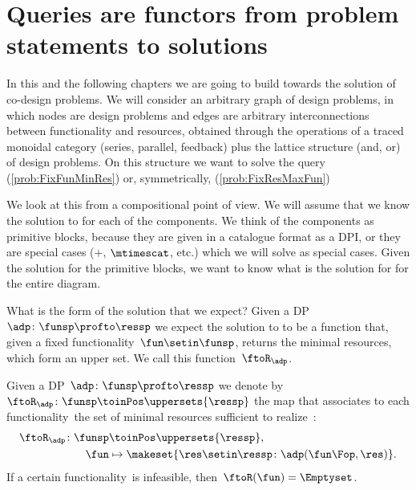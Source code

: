 \section{Queries are functors from problem statements to solutions}

In this and the following chapters we are going to build towards the solution of co-design problems.
We will consider an arbitrary graph of design problems, in which nodes are design problems and edges are arbitrary interconnections between functionality and resources, obtained through the operations of a traced monoidal category (series, parallel, feedback) plus the lattice structure (and, or) of design problems.
On this structure we want to solve the query \FixFunMinRes (\cref{prob:FixFunMinRes}) or, symmetrically, \FixResMaxFun (\cref{prob:FixResMaxFun})

We look at this from a compositional point of view.
We will assume that we know the solution to \FixFunMinRes for each of the components.
We think of the components as primitive blocks, because they are given in a catalogue format as a DPI, or they are special cases ($+$, $\mtimescat$, etc.) which we will solve as special cases.
Given the solution for the primitive blocks, we want to know what is the solution for \FixFunMinRes for the entire diagram.

What is the form of the solution that we expect?
Given a DP~$\adp\colon \funsp \profto \ressp$ we expect the solution to \FixFunMinRes to be a function that, given a fixed functionality~$\fun\setin\funsp$, returns the minimal resources, which form an upper set.
We call this function~$\ftoR_\adp$.

\begin{definition}
    \label{def:ftoR-dp}
    Given a DP~$\adp\colon\funsp\profto\ressp$ we denote by~$\ftoR_{\adp}\colon \funsp\toinPos \uppersets{\ressp}$ the map that associates to each functionality~\fun the set of minimal resources sufficient to realize~\fun:
    \begin{equation*}
        \begin{aligned}
            \ftoR_{\adp}\colon \funsp & \toinPos \uppersets{\ressp}, \\
            \fun                      & \mapsto \makeset{ \res \setin \ressp \colon \adp(\fun\Fop, \res)}.
        \end{aligned}
    \end{equation*}
    If a certain functionality~\fun is infeasible, then~$\ftoR(\fun)=\Emptyset$.
\end{definition}

